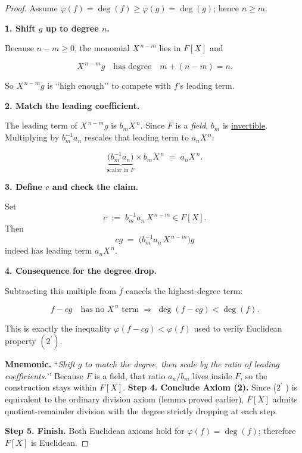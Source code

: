 \documentclass[12pt]{article}
\theoremstyle{definition} %
\theoremstyle{plain} %
\begin{document}
\begin{proof}
Assume \(\varphi(f)=\deg(f)\ge\varphi(g)=\deg(g)\); hence \(n\ge m\).

\bigskip
\textbf{1.  Shift $g$ up to degree $n$.}

Because \(n-m\ge0\), the monomial \(X^{\,n-m}\) lies in \(F[X]\) and

\[
   X^{\,n-m}g
   \quad\text{has degree}\quad
   m + (n-m) = n.
\]

So \(X^{\,n-m}g\) is “high enough’’ to compete with \(f\)’s leading term.

\bigskip
\textbf{2.  Match the leading coefficient.}

The leading term of \(X^{\,n-m}g\) is \(b_mX^{\,n}\).
Since \(F\) is a \emph{field}, \(b_m\) is \underline{invertible}.  
Multiplying by \(b_m^{-1}a_n\) rescales that leading term to
\(a_nX^{\,n}\):

\[
   \underbrace{\bigl(b_m^{-1}a_n\bigr)}_{\text{scalar in }F}
   \times
   b_mX^{\,n}
   \;=\;
   a_nX^{\,n}.
\]

\bigskip
\textbf{3.  Define $c$ and check the claim.}

Set
\[
     c \;:=\; b_m^{-1}a_n\,X^{\,n-m}\in F[X].
\]
Then
\[
     cg
     \;=\;
     \bigl(b_m^{-1}a_n\,X^{\,n-m}\bigr)g
\]
indeed has leading term \(a_nX^{\,n}\).

\bigskip
\textbf{4.  Consequence for the degree drop.}

Subtracting this multiple from \(f\) cancels the highest-degree term:

\[
   f - cg
   \quad\text{has no }X^{\,n}\text{ term}
   \;\Longrightarrow\;
   \deg(f-cg) < \deg(f).
\]

This is exactly the inequality
\(
   \varphi(f-cg) < \varphi(f)
\)
used to verify Euclidean property $(2^\prime )$.

\bigskip
\textbf{Mnemonic.}  
“\emph{Shift \(g\) to match the degree, then scale by the ratio of leading
coefficients.}’’
Because \(F\) is a field, that ratio \(a_n/b_m\) lives inside \(F\),
so the construction stays within \(F[X]\).
  \medskip
  \textbf{Step 4.  Conclude Axiom (2).}  
  Since ($2^\prime$  ) is equivalent to the ordinary division axiom (lemma proved
  earlier), \(F[X]\) admits quotient-remainder division with the degree
  strictly dropping at each step.
  
  \medskip
  \textbf{Step 5.  Finish.}  
  Both Euclidean axioms hold for \(\varphi(f)=\deg(f)\); therefore \(F[X]\)
  is Euclidean.
  \end{proof}
  
\end{document}
